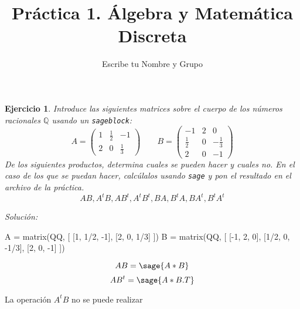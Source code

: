 \documentclass{amsart}
\title{Práctica 1. Álgebra y Matemática Discreta}
\author{Escribe tu Nombre y Grupo}
\newtheorem{ejer}{Ejercicio}
\begin{document}
\maketitle

\begin{ejer}
Introduce las siguientes matrices sobre el cuerpo de los números racionales
$\mathbb Q$ usando un {\tt sageblock}:
$$ 
A = \left(\begin{array}{ccc} 1 & \frac{1}{2} & -1 \\ 2 & 0 & \frac{1}{3} \end{array}\right) 
\qquad
B = \left(\begin{array}{ccc} -1 & 2 & 0 \\ \frac{1}{2} & 0 & -\frac{1}{3} \\ 2 & 0 & -1 \end{array}\right)
$$
De los siguientes productos, determina cuales se pueden hacer y cuales no. En el 
caso de los que se puedan hacer, calcúlalos usando {\tt sage} y pon el resultado
en el archivo de la práctica.
$$AB, A^t B, A B^t, A^t B^t, BA, B^t A, B A^t, B^t A^t$$
\end{ejer}
{\it Solución: }

\begin{sageblock}
A = matrix(QQ, [ [1, 1/2, -1], [2, 0, 1/3] ])
B = matrix(QQ, [ [-1, 2, 0], [1/2, 0, -1/3], [2, 0, -1] ])
\end{sageblock}
 
$$ AB = \sage{A*B} $$
$$ AB^t = \sage{A*B.T} $$

La operación $ A^tB $ no se puede realizar

\end{document}
